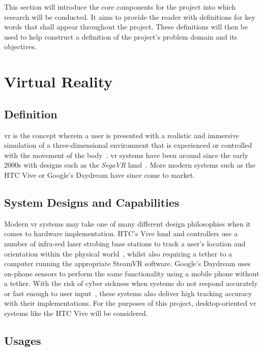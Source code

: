 This section will introduce the core components for the project into which research will be conducted. It aims to provide the reader with definitions for key words that shall appear throughout the project. These definitions will then be used to help construct a definition of the project's problem domain and its objectives.

\section{Virtual Reality}

    \subsection{Definition}
    
        \acrfull{vr} is the concept wherein a user is presented with a realistic and immersive simulation of a three-dimensional environment that is experienced or controlled with the movement of the body~\cite{Dictionary2017}. \acrshort{vr} systems have been around since the early 2000s with designs such as the \textit{SegaVR} \acrfull{hmd}~\cite{SegaVR2004}. More modern systems such as the HTC Vive or Google's Daydream have since come to market.
    
    \subsection{System Designs and Capabilities}
    
        Modern \acrshort{vr} systems may take one of many different design philosophies when it comes to hardware implementation. HTC's Vive \acrshort{hmd} and controllers use a number of infra-red laser strobing base stations to track a user's location and orientation within the physical world~\cite{LighthouseAnalysis2016}, whilst also requiring a tether to a computer running the appropriate SteamVR software. Google's Daydream uses on-phone sensors to perform the same functionality using a mobile phone without a tether. With the risk of cyber sickness when systems do not respond accurately or fast enough to user input~\cite{LaViola:2000:DCV:333329.333344}, these systems also deliver high tracking accuracy with their implementations. For the purposes of this project, desktop-oriented \acrshort{vr} systems like the HTC Vive will be considered.
    
    \subsection{Usages}
    
